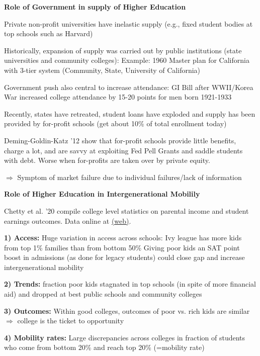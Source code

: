 \documentclass[landscape]{slides}
\begin{document}
\begin{slide}
\begin{center}
{\bf Role of Government in supply of Higher Education}
\end{center}
Private non-profit universities have inelastic supply (e.g., fixed student bodies at top schools such as Harvard)

Historically, expansion of supply was carried out by public institutions (state universities and
community colleges): Example: 1960 Master plan for California with 3-tier system (Community, State, University of California)

\small
Government push also central to increase attendance: GI Bill after WWII/Korea War increased college attendance by 15-20
points for men born 1921-1933 %
\normalsize

Recently, states have retreated, student loans have exploded and supply has been provided by for-profit schools (get about 10\% of total
enrollment today)

\small
Deming-Goldin-Katz '12 show that for-profit schools provide little benefits, charge a lot, and are savvy
at exploiting Fed Pell Grants and saddle students with debt. Worse when for-profits are taken over by private equity.

$\Rightarrow$ Symptom of market failure due to individual failures/lack of information
\end{slide}

\begin{slide}

\end{slide}


\begin{slide}
\begin{center}
{\bf Role of Higher Education in Intergenerational Mobilily}
\end{center}
Chetty et al. '20 compile college level statistics  on parental income and student earnings outcomes. 
Data online at \href{http://www.equality-of-opportunity.org/data/index.html#college}{(web)}. %

\textbf{1) Access:} Huge variation in access across schools: Ivy league has more kids from top 1\% families than from bottom 50\% 
\small Giving poor kids an SAT point boost in admissions (as done for legacy students) could close  gap and increase
intergenerational mobility \normalsize

\textbf{2) Trends:} fraction poor kids stagnated in top schools (in spite of more financial aid) and dropped at best public schools and community
colleges 
 
\textbf{3) Outcomes:} Within good colleges, outcomes of poor vs. rich kids are similar $\Rightarrow$ college is the ticket to opportunity

\textbf{4) Mobility rates:} Large discrepancies across colleges in fraction of students who come from bottom 20\% and reach top 20\% (=mobility rate) 

\end{slide}
\end{document}
